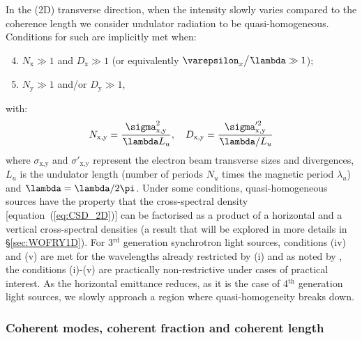 \documentclass{iucr}              %
\newcommand{\lambdabar}{{\mkern0.75mu\mathchar '26\mkern -8.2mu\lambda}}
\begin{document}
In the (2D) transverse direction, when the intensity slowly varies compared to the coherence length we consider undulator radiation to be quasi-homogeneous. Conditions for such are implicitly met when: 
\begin{enumerate}[label=(\roman*)]
\setcounter{enumi}{3}
\item $N_\text{x}\gg1$ and $D_\text{x}\gg1$ (or equivalently $\varepsilon_x\big/\lambdabar\gg1$);
\item $N_\text{y}\gg1$ and/or $D_\text{y}\gg1$,
\end{enumerate}
with:
\begin{equation}
    N_\text{x,y}=\frac{\sigma^2_\text{x,y}}{\lambdabar L_u}, \quad D_\text{x,y}=\frac{\sigma'^2_\text{x,y}}{\lambdabar/L_u}
\end{equation}
where $\sigma_\text{x,y}$ and $\sigma'_\text{x,y}$ represent the electron beam transverse sizes and divergences, $L_u$ is the undulator length (number of periods $N_u$ times the magnetic period $\lambda_u$) and $\lambdabar=\lambda/2\pi$.
Under some conditions, quasi-homogeneous sources have the property that the cross-spectral density [equation~(\ref{eq:CSD_2D})] can be factorised as a product of a horizontal and a vertical cross-spectral densities (a result that will be explored in more details in \S\ref{sec:WOFRY1D}). For 3$^{\text{rd}}$ generation synchrotron light sources, conditions (iv) and (v) are met for the wavelengths already restricted by (i) and as noted by , the conditions (i)-(v) are practically non-restrictive under cases of practical interest. As the horizontal emittance reduces, as it is the case of 4$^{\text{th}}$ generation light sources, we slowly approach a region where quasi-homogeneity breaks down.

\subsubsection{Coherent modes, coherent fraction and coherent length\\}
\end{document}
